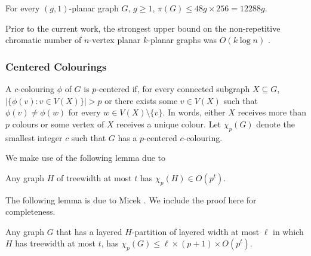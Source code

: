 \documentclass{patmorin}
\begin{document}
\begin{cor}
  For every $(g,1)$-planar graph $G$, $g\ge 1$, $\pi(G)\le 48g\times 256= 12288g$.
\end{cor}

Prior to the current work, the strongest upper bound on the non-repetitive chromatic number of $n$-vertex planar $k$-planar graphs was $O(k\log n)$ \cite{dujmovic.morin.ea:layered}.

\subsubsection{Centered Colourings}

A $c$-colouring $\phi$ of $G$ is $p$-centered if, for every connected subgraph $X\subseteq G$, $|\{\phi(v):v\in V(X)\}| > p$ or there exists some $v\in V(X)$ such that $\phi(v)\neq \phi(w)$ for every $w\in V(X)\setminus\{v\}$.  In words, either $X$ receives more than $p$ colours or some vertex of $X$ receives a unique colour.  Let $\chi_p(G)$ denote the smallest integer $c$ such that $G$ has a $p$-centered $c$-colouring.

We make use of the following lemma due to \citet{pilipczuk.siebertz:polynomial-arxiv,pilipczuk.siebertz:polynomial-soda}
\begin{lem}
  Any graph $H$ of treewidth at most $t$ has $\chi_p(H)\in O(p^t)$.
\end{lem}

The following lemma is due to Micek \cite{micek:personal}. We include the proof here for completeness.

\begin{lem}
  Any graph $G$ that has a layered $H$-partition of layered width at most $\ell$ in which $H$ has treewidth at most $t$, has $\chi_p(G)\le \ell\times (p+1)\times O(p^t)$.
\end{lem}
\end{document}
